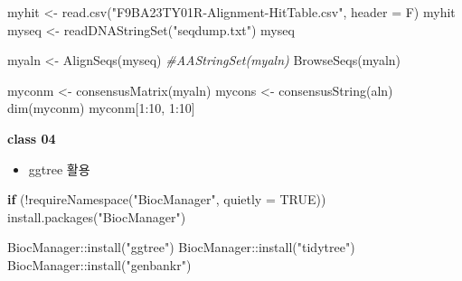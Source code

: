 \documentclass[
]{book}
\newenvironment{Shaded}{\begin{snugshade}}{\end{snugshade}}
\newcommand{\AttributeTok}[1]{\textcolor[rgb]{0.77,0.63,0.00}{#1}}
\newcommand{\CommentTok}[1]{\textcolor[rgb]{0.56,0.35,0.01}{\textit{#1}}}
\newcommand{\ConstantTok}[1]{\textcolor[rgb]{0.00,0.00,0.00}{#1}}
\newcommand{\ControlFlowTok}[1]{\textcolor[rgb]{0.13,0.29,0.53}{\textbf{#1}}}
\newcommand{\DecValTok}[1]{\textcolor[rgb]{0.00,0.00,0.81}{#1}}
\newcommand{\FunctionTok}[1]{\textcolor[rgb]{0.00,0.00,0.00}{#1}}
\newcommand{\NormalTok}[1]{#1}
\newcommand{\OtherTok}[1]{\textcolor[rgb]{0.56,0.35,0.01}{#1}}
\newcommand{\SpecialCharTok}[1]{\textcolor[rgb]{0.00,0.00,0.00}{#1}}
\newcommand{\StringTok}[1]{\textcolor[rgb]{0.31,0.60,0.02}{#1}}
\providecommand{\tightlist}{%
  \setlength{\itemsep}{0pt}\setlength{\parskip}{0pt}}
\begin{document}
\begin{Shaded}
\begin{Highlighting}[]

\NormalTok{myhit }\OtherTok{\textless{}{-}} \FunctionTok{read.csv}\NormalTok{(}\StringTok{"F9BA23TY01R{-}Alignment{-}HitTable.csv"}\NormalTok{, }\AttributeTok{header =}\NormalTok{ F)}
\NormalTok{myhit}
\NormalTok{myseq }\OtherTok{\textless{}{-}} \FunctionTok{readDNAStringSet}\NormalTok{(}\StringTok{"seqdump.txt"}\NormalTok{)}
\NormalTok{myseq}

\NormalTok{myaln }\OtherTok{\textless{}{-}} \FunctionTok{AlignSeqs}\NormalTok{(myseq)}
\CommentTok{\#AAStringSet(myaln)}
\FunctionTok{BrowseSeqs}\NormalTok{(myaln)}

\NormalTok{myconm }\OtherTok{\textless{}{-}} \FunctionTok{consensusMatrix}\NormalTok{(myaln)}
\NormalTok{mycons }\OtherTok{\textless{}{-}} \FunctionTok{consensusString}\NormalTok{(aln)}
\FunctionTok{dim}\NormalTok{(myconm)}
\NormalTok{myconm[}\DecValTok{1}\SpecialCharTok{:}\DecValTok{10}\NormalTok{, }\DecValTok{1}\SpecialCharTok{:}\DecValTok{10}\NormalTok{]}
\end{Highlighting}
\end{Shaded}

\textbf{class 04}

\begin{itemize}
\tightlist
\item
  ggtree 활용
\end{itemize}

\begin{Shaded}
\begin{Highlighting}[]
\ControlFlowTok{if}\NormalTok{ (}\SpecialCharTok{!}\FunctionTok{requireNamespace}\NormalTok{(}\StringTok{"BiocManager"}\NormalTok{, }\AttributeTok{quietly =} \ConstantTok{TRUE}\NormalTok{))}
    \FunctionTok{install.packages}\NormalTok{(}\StringTok{"BiocManager"}\NormalTok{)}

\NormalTok{BiocManager}\SpecialCharTok{::}\FunctionTok{install}\NormalTok{(}\StringTok{"ggtree"}\NormalTok{)}
\NormalTok{BiocManager}\SpecialCharTok{::}\FunctionTok{install}\NormalTok{(}\StringTok{"tidytree"}\NormalTok{)}
\NormalTok{BiocManager}\SpecialCharTok{::}\FunctionTok{install}\NormalTok{(}\StringTok{"genbankr"}\NormalTok{)}
\end{Highlighting}
\end{Shaded}
\end{document}
